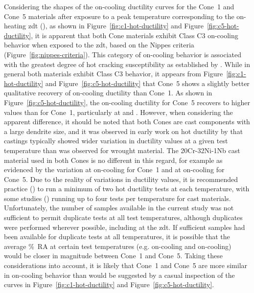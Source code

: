 {Considering the shapes of the on-cooling ductility curves for the Cone~1 and Cone~5 materials after exposure to a peak temperature corresponding to the on-heating \gls{zdt} (), as shown in Figure~\ref{fig:c1-hot-ductility} and Figure~\ref{fig:c5-hot-ductility}, it is apparent that both Cone materials exhibit Class C3 on-cooling behavior when exposed to the \gls{zdt}, based on the Nippes criteria (Figure~\ref{fig:nippes-criteria}).  This category of on-cooling behavior is associated with the greatest degree of hot cracking susceptibility as established by \citet{nippes_further_1957}.  While in general both materials exhibit Class C3 behavior, it appears from Figure~\ref{fig:c1-hot-ductility} and Figure~\ref{fig:c5-hot-ductility} that Cone~5 shows a slightly better qualitative recovery of on-cooling ductility than Cone~1.  As shown in Figure~\ref{fig:c5-hot-ductility}, the on-cooling ductility for Cone~5 recovers to higher values than for Cone~1, particularly at  and .  However, when considering the apparent difference, it should be noted that both Cones are cast components with a large dendrite size, and it was observed in early work on hot ductility by \citet{nippes_further_1957} that castings typically showed wider variation in ductility values at a given test temperature than was observed for wrought material.  The 20Cr-32Ni-1Nb cast material used in both Cones is no different in this regard, for example as evidenced by the variation at  on-cooling for Cone~1 and at  on-cooling for Cone~5.  Due to the reality of variations in ductility values, it is recommended practice (\citet{lundin_standardization_1990_experiment}) to run a minimum of two hot ductility tests at each temperature, with some studies (\citet{nippes_further_1957}) running up to four tests per temperature for cast materials.  Unfortunately, the number of samples available in the current study was not sufficient to permit duplicate tests at all test temperatures, although duplicates were performed wherever possible, including at the \gls{zdt}.  If sufficient samples had been available for duplicate tests at all temperatures, it is possible that the average \%~RA at certain test temperatures (e.g.  on-cooling and  on-cooling) would be closer in magnitude between Cone~1 and Cone~5.  Taking these considerations into account, it is likely that Cone~1 and Cone~5 are more similar in on-cooling behavior than would be suggested by a casual inspection of the curves in Figure~\ref{fig:c1-hot-ductility} and Figure~\ref{fig:c5-hot-ductility}.

}
